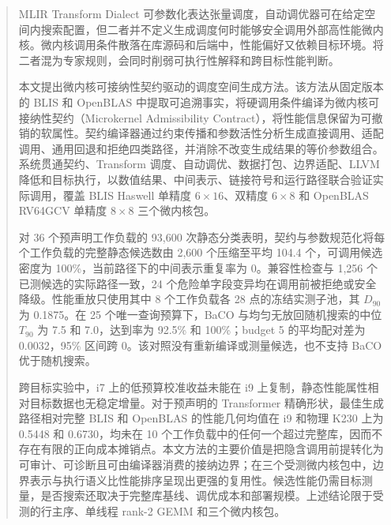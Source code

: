 
\begin{abstract}
MLIR Transform Dialect 可参数化表达张量调度，自动调优器可在给定空间内搜索配置，但二者并不定义生成调度何时能够安全调用外部高性能微内核。微内核调用条件散落在库源码和后端中，性能偏好又依赖目标环境。将二者混为专家规则，会同时削弱可执行性解释和跨目标性能判断。

本文提出微内核可接纳性契约驱动的调度空间生成方法。该方法从固定版本的 BLIS 和 OpenBLAS 中提取可追溯事实，将硬调用条件编译为微内核可接纳性契约（Microkernel Admissibility Contract），将性能信息保留为可撤销的软属性。契约编译器通过约束传播和参数活性分析生成直接调用、适配调用、通用回退和拒绝四类路径，并消除不改变生成结果的等价参数组合。系统贯通契约、Transform 调度、自动调优、数据打包、边界适配、LLVM 降低和目标执行，以数值结果、中间表示、链接符号和运行路径联合验证实际调用，覆盖 BLIS Haswell 单精度 $6\times16$、双精度 $6\times8$ 和 OpenBLAS RV64GCV 单精度 $8\times8$ 三个微内核包。

对 36 个预声明工作负载的 93,600 次静态分类表明，契约与参数规范化将每个工作负载的完整静态候选数由 2,600 个压缩至平均 104.4 个，可调用候选密度为 100\%，当前路径下的中间表示重复率为 0。兼容性检查与 1,256 个已测候选的实际路径一致，24 个危险单字段变异均在调用前被拒绝或安全降级。性能重放只使用其中 8 个工作负载各 28 点的冻结实测子池，其 $D_{90}$ 为 0.1875。在 25 个唯一查询预算下，BaCO 与均匀无放回随机搜索的中位 $T_{90}$ 为 7.5 和 7.0，达到率为 92.5\% 和 100\%；budget 5 的平均配对差为 0.0032，95\% 区间跨 0。该对照没有重新编译或测量候选，也不支持 BaCO 优于随机搜索。

跨目标实验中，i7 上的低预算校准收益未能在 i9 上复制，静态性能属性相对目标数据也无稳定增量。对于预声明的 Transformer 精确形状，最佳生成路径相对完整 BLIS 和 OpenBLAS 的性能几何均值在 i9 和物理 K230 上为 0.5448 和 0.6730，均未在 10 个工作负载中的任何一个超过完整库，因而不存在有限的正向成本摊销点。本文方法的主要价值是把隐含调用前提转化为可审计、可诊断且可由编译器消费的接纳边界；在三个受测微内核包中，边界表示与执行语义比性能排序呈现出更强的复用性。候选性能仍需目标测量，是否搜索还取决于完整库基线、调优成本和部署规模。上述结论限于受测的行主序、单线程 rank-2 GEMM 和三个微内核包。

\end{abstract}

